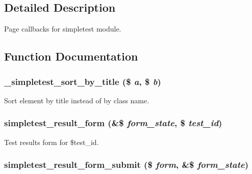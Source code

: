 \subsection{Detailed Description}
Page callbacks for simpletest module. 

\subsection{Function Documentation}
\hypertarget{simpletest_8pages_8inc_a2fd122eb416ff956a0856b771a0e2650}{
\subsubsection[{\_\-simpletest\_\-sort\_\-by\_\-title}]{\setlength{\rightskip}{0pt plus 5cm}\_\-simpletest\_\-sort\_\-by\_\-title (\$ {\em a}, \/  \$ {\em b})}}
\label{simpletest_8pages_8inc_a2fd122eb416ff956a0856b771a0e2650}
Sort element by title instead of by class name. \hypertarget{simpletest_8pages_8inc_aa718f24f482932ac038c6ed8f4a0f082}{
\subsubsection[{simpletest\_\-result\_\-form}]{\setlength{\rightskip}{0pt plus 5cm}simpletest\_\-result\_\-form (\&\$ {\em form\_\-state}, \/  \$ {\em test\_\-id})}}
\label{simpletest_8pages_8inc_aa718f24f482932ac038c6ed8f4a0f082}
Test results form for \$test\_\-id. \hypertarget{simpletest_8pages_8inc_aa49754acf61555f23482a0257db56da2}{
\subsubsection[{simpletest\_\-result\_\-form\_\-submit}]{\setlength{\rightskip}{0pt plus 5cm}simpletest\_\-result\_\-form\_\-submit (\$ {\em form}, \/  \&\$ {\em form\_\-state})}}
